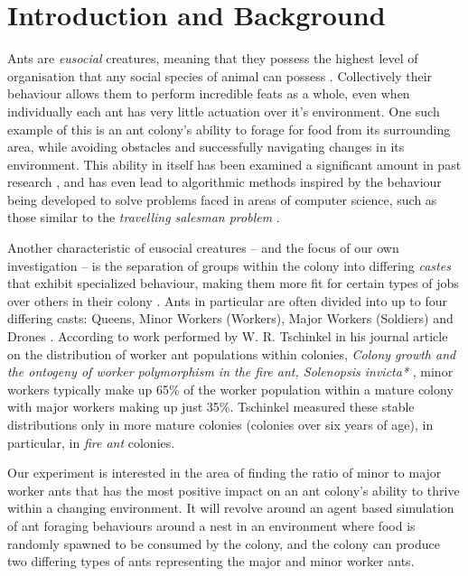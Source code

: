 \section{Introduction and Background}
		
    Ants are \textit{eusocial} creatures, meaning that they possess the highest level of organisation that any social species of animal can possess \cite{wilson_insect_1971, hadley_what_nodate}. Collectively their behaviour allows them to perform
    incredible feats as a whole, even when individually each ant has very little actuation over it's environment. One such example of this is an ant colony's ability to forage for food from its surrounding area, while avoiding
    obstacles and successfully navigating changes in its environment. This ability in itself has been examined a significant amount in past research \cite{vittori_modeling_2004, a_panait_ant_2004}, and has even lead to algorithmic
    methods inspired by the behaviour being developed to solve problems faced in areas of computer science, such as those similar to the \textit{travelling salesman problem} \cite{dorigo_ant_2006, zhang_improved_2007}.

    Another characteristic of eusocial creatures -- and the focus of our own investigation -- is the separation of groups within the colony into differing \textit{castes} that exhibit specialized behaviour, making them more fit
    for certain types of jobs over others in their colony \cite{hadley_what_nodate}. Ants in particular are often divided into up to four differing casts: Queens, Minor Workers (Workers), Major Workers (Soldiers) and Drones \cite{noauthor_ant_nodate,noauthor_castes_nodate}.
    According to work performed by W. R. Tschinkel in his journal article on the distribution of worker ant populations within colonies, \textit{Colony growth and the ontogeny of worker polymorphism in the fire ant, Solenopsis invicta*} \cite{Tschinkel1988}, minor workers typically make up 65\% of the worker population within a mature colony with major workers making up just 35\%. Tschinkel measured these stable distributions only in more mature
    colonies (colonies over six years of age), in particular, in \textit{fire ant} colonies.

    Our experiment is interested in the area of finding the ratio of minor to major worker ants that has the most positive impact on an ant colony's ability to thrive within a changing environment. It will
    revolve around an agent based simulation of ant foraging behaviours around a nest in an environment where food is randomly spawned to be consumed by the colony, and the colony can produce two differing types of ants
    representing the major and minor worker ants.


